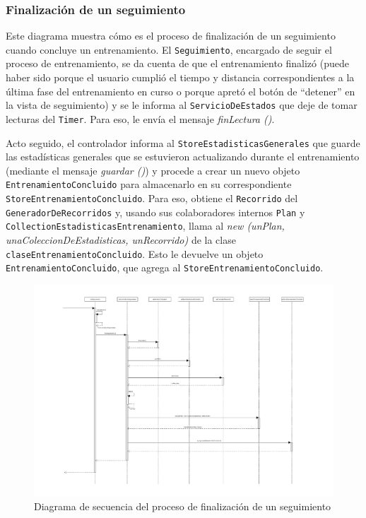 \newpage

\subsubsection{Finalización de un seguimiento}

Este diagrama muestra cómo es el proceso de finalización de un seguimiento cuando concluye un entrenamiento. El \texttt{Seguimiento}, encargado de seguir el proceso de entrenamiento, se da cuenta de que el entrenamiento finalizó (puede haber sido porque el usuario cumplió el tiempo y distancia correspondientes a la última fase del entrenamiento en curso o porque apretó el botón de ``detener'' en la vista de seguimiento) y se le informa al \texttt{ServicioDeEstados} que deje de tomar lecturas del \texttt{Timer}. Para eso, le envía el mensaje \emph{finLectura ()}. 

Acto seguido, el controlador informa al \texttt{StoreEstadisticasGenerales} que guarde las estadísticas generales que se estuvieron actualizando durante el entrenamiento (mediante el mensaje \emph{guardar ()}) y procede a crear un nuevo objeto \texttt{EntrenamientoConcluido} para almacenarlo en su correspondiente \texttt{StoreEntrenamientoConcluido}. Para eso, obtiene el \texttt{Recorrido} del \texttt{GeneradorDeRecorridos} y, usando sus colaboradores internos \texttt{Plan} y \texttt{CollectionEstadisticasEntrenamiento}, llama al \emph{new (unPlan, unaColeccionDeEstadisticas, unRecorrido)} de la clase \texttt{claseEntrenamientoConcluido}. Esto le devuelve un objeto \texttt{EntrenamientoConcluido}, que agrega al \texttt{StoreEntrenamientoConcluido}.

\newpage

\begin{landscape}
	\begin{figure}[h]
		\includegraphics[scale=0.8]{images/FinalizacionSeguimiento.pdf}
		\caption{Diagrama de secuencia del proceso de finalización de un seguimiento}
	\end{figure} 
\end{landscape}

